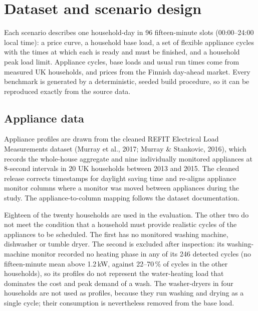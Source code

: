 \documentclass[12pt,a4paper]{report}
\begin{document}
\section{Dataset and scenario design}
\label{sec:dataset}

Each scenario describes one household-day in 96 fifteen-minute slots
(00:00--24:00 local time): a price curve, a household base load, a set
of flexible appliance cycles with the times at which each is ready and
must be finished, and a household peak load limit. Appliance cycles,
base loads and usual run times come from measured UK households, and
prices from the Finnish day-ahead market. Every benchmark is generated
by a deterministic, seeded build procedure, so it can be reproduced
exactly from the source data.

\subsection{Appliance data}

Appliance profiles are drawn from the cleaned REFIT Electrical Load
Measurements dataset (Murray et al., 2017; Murray \& Stankovic, 2016),
which records the whole-house aggregate and nine individually monitored
appliances at 8-second intervals in 20 UK households between 2013 and
2015. The cleaned release corrects timestamps for daylight saving time
and re-aligns appliance monitor columns where a monitor was moved between
appliances during the study. The appliance-to-column mapping follows
the dataset documentation.

Eighteen of the twenty households are used in the evaluation. The
other two do not meet the condition that a household must provide
realistic cycles of the appliances to be scheduled. The first has no
monitored washing machine, dishwasher or tumble dryer. The second is
excluded after inspection: its washing-machine monitor recorded no
heating phase in any of its 246 detected cycles (no fifteen-minute mean
above 1.2\,kW, against 22--70\,\% of cycles in the other households),
so its profiles do not represent the water-heating load that dominates
the cost and peak demand of a wash. The washer-dryers in four households
are not used as profiles, because they run washing and drying as a
single cycle; their consumption is nevertheless removed from the base
load.
\end{document}
